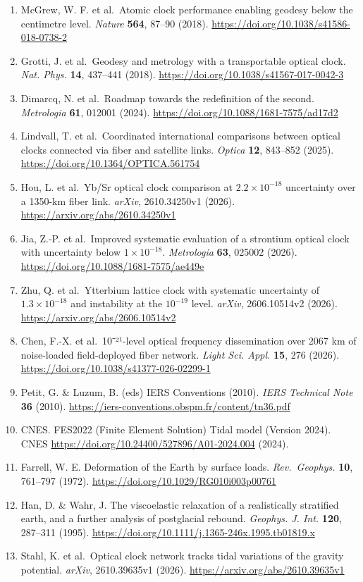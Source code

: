 \documentclass[
  12pt,
  a4paper,
]{article}
\begin{document}
\begin{enumerate}
\item
  McGrew, W. F. et al.~Atomic clock performance enabling geodesy below
  the centimetre level. \emph{Nature} \textbf{564}, 87--90 (2018).
  \url{https://doi.org/10.1038/s41586-018-0738-2}
\item
  Grotti, J. et al.~Geodesy and metrology with a transportable optical
  clock. \emph{Nat. Phys.} \textbf{14}, 437--441 (2018).
  \url{https://doi.org/10.1038/s41567-017-0042-3}
\item
  Dimarcq, N. et al.~Roadmap towards the redefinition of the second.
  \emph{Metrologia} \textbf{61}, 012001 (2024).
  \url{https://doi.org/10.1088/1681-7575/ad17d2}
\item
  Lindvall, T. et al.~Coordinated international comparisons between
  optical clocks connected via fiber and satellite links. \emph{Optica}
  \textbf{12}, 843--852 (2025).
  \url{https://doi.org/10.1364/OPTICA.561754}
\item
  Hou, L. et al.~Yb/Sr optical clock comparison at \(2.2\times10^{-18}\)
  uncertainty over a 1350-km fiber link. \emph{arXiv}, 2610.34250v1
  (2026). \url{https://arxiv.org/abs/2610.34250v1}
\item
  Jia, Z.-P. et al.~Improved systematic evaluation of a strontium
  optical clock with uncertainty below \(1\times10^{-18}\).
  \emph{Metrologia} \textbf{63}, 025002 (2026).
  \url{https://doi.org/10.1088/1681-7575/ae449e}
\item
  Zhu, Q. et al.~Ytterbium lattice clock with systematic uncertainty of
  \(1.3\times 10^{-18}\) and instability at the \(10^{-19}\) level.
  \emph{arXiv}, 2606.10514v2 (2026).
  \url{https://arxiv.org/abs/2606.10514v2}
\item
  Chen, F.-X. et al.~10⁻²¹-level optical frequency dissemination over
  2067 km of noise-loaded field-deployed fiber network. \emph{Light Sci.
  Appl.} \textbf{15}, 276 (2026).
  \url{https://doi.org/10.1038/s41377-026-02299-1}
\item
  Petit, G. \& Luzum, B. (eds) IERS Conventions (2010). \emph{IERS
  Technical Note} \textbf{36} (2010).
  \url{https://iers-conventions.obspm.fr/content/tn36.pdf}
\item
  CNES. FES2022 (Finite Element Solution) Tidal model (Version 2024).
  CNES \url{https://doi.org/10.24400/527896/A01-2024.004} (2024).
\item
  Farrell, W. E. Deformation of the Earth by surface loads.
  \emph{Rev.~Geophys.} \textbf{10}, 761--797 (1972).
  \url{https://doi.org/10.1029/RG010i003p00761}
\item
  Han, D. \& Wahr, J. The viscoelastic relaxation of a realistically
  stratified earth, and a further analysis of postglacial rebound.
  \emph{Geophys. J. Int.} \textbf{120}, 287--311 (1995).
  \url{https://doi.org/10.1111/j.1365-246x.1995.tb01819.x}
\item
  Stahl, K. et al.~Optical clock network tracks tidal variations of the
  gravity potential. \emph{arXiv}, 2610.39635v1 (2026).
  \url{https://arxiv.org/abs/2610.39635v1}
\end{enumerate}
\end{document}
